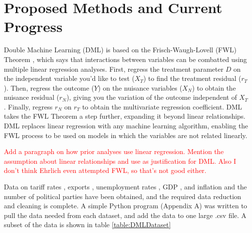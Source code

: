 \documentclass[11pt]{article}
\begin{document}
{%

\section{Proposed Methods and Current Progress} 

Double Machine Learning (DML) is based on the Frisch-Waugh-Lovell (FWL) Theorem \citep{FrischWaugh1933, Lovell1963}, which says that interactions between variables can be combatted using multiple linear regression analyses. First, regress the treatment parameter $D$ on the independent variable you'd like to test ($X_{T}$) to find the treatment residual ($r_T$). Then, regress the outcome ($Y$) on the nuisance variables ($X_{N}$) to obtain the nuisance residual ($r_N$), giving you the variation of the outcome independent of $X_T$. Finally, regress $r_N$ on $r_T$ to obtain the multivariate regression coefficient. DML takes the FWL Theorem a step further, expanding it beyond linear relationships. DML replaces linear regression with any machine learning algorithm, enabling the FWL process to be used on models in which the variables are not related linearly.  

\textcolor{red}{Add a paragraph on how prior analyses use linear regression. Mention the assumption about linear relationships and use as justification for DML. Also I don't think Ehrlich even attempted FWL, so that's not good either.} 

Data on tariff rates \citep{TariffData}, exports \citep{ExportData}, unemployment rates \citep{UnemploymentData}, GDP \citep{GDP_US_Data, GDPCapitaData}, and inflation \citep{InflationData} and the number of political parties \citep{NoPartiesData} have been obtained, and the required data reduction and cleaning is complete. A simple Python program (Appendix A) was written to pull the data needed from each dataset, and add the data to one large .csv file. A subset of the data is shown in table \ref{table:DMLDataset}\\

}
\end{document}
